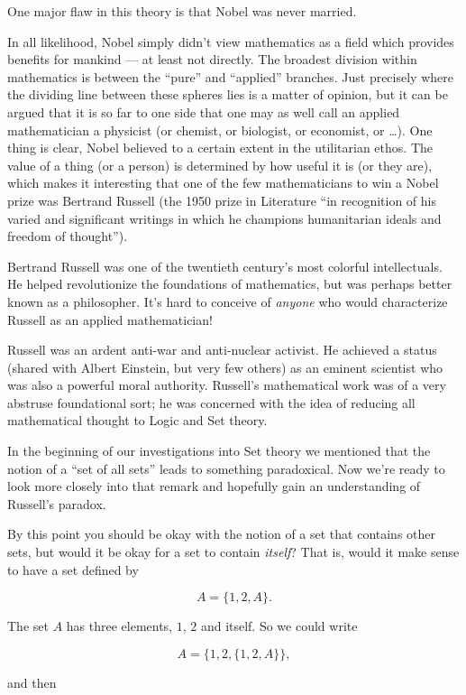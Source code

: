 One major flaw in this theory is that Nobel was never married.

In all likelihood, Nobel simply didn't view mathematics as a field
which provides benefits for mankind --- at least not directly. 
The broadest division within mathematics is between the ``pure''
and ``applied'' branches.  Just precisely where the dividing line
between these spheres lies is a matter of opinion, but it can be
argued that it is so far to one side that one may as well call an
applied mathematician a physicist 
(or chemist, or biologist, or economist, or \ldots).  One thing is
clear, Nobel believed to a certain extent in the utilitarian ethos.
The value of a thing (or a person) is determined by how useful it is (or they 
are), which makes it interesting that one of the few mathematicians
to win a Nobel prize was Bertrand Russell (the 1950 prize in Literature
 ``in recognition of his varied and significant writings in which he 
champions humanitarian ideals and freedom of thought''). 
 
Bertrand Russell was one of the twentieth century's most colorful
intellectuals.  He helped revolutionize the foundations of mathematics,
but was perhaps better known as a philosopher.  It's hard to conceive 
of \emph{anyone} who would characterize Russell as an applied mathematician!

Russell was an ardent anti-war and anti-nuclear activist.  He achieved a
status (shared with Albert Einstein, but very few others) as an eminent
scientist who was also a powerful moral authority.  Russell's mathematical
work was of a very abstruse foundational sort; he was concerned with
the idea of reducing all mathematical thought to Logic and Set theory.

In the beginning of our investigations into Set theory we mentioned 
that the notion of a ``set of all sets'' leads to something paradoxical.
Now we're ready to look more closely into that remark and hopefully 
gain an understanding of Russell's paradox.

By this point you should be okay with the notion of a set that 
contains other sets, but would it be okay for a set to contain
\emph{itself}?  That is, would it make sense to have a set 
defined by

\[ A = \{ 1, 2, A \}. \]

\noindent The set $A$ has three elements, $1$, $2$ and itself.  So we
could write

\[ A = \{ 1, 2, \{ 1, 2, A \} \}, \]
 
\noindent and then

